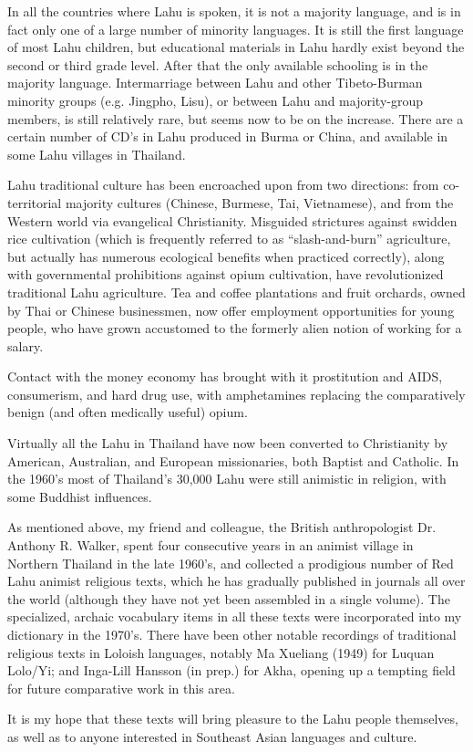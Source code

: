In all the countries where Lahu is spoken, it is not a majority
language, and is in fact only one of a large number of minority
languages. It is still the first language of most Lahu children, but
educational materials in Lahu hardly exist beyond the second or third
grade level. After that the only available schooling is in the majority
language. Intermarriage between Lahu and other Tibeto-Burman minority
groups (e.g. Jingpho, Lisu), or between Lahu and majority-group members,
is still relatively rare, but seems now to be on the increase. There are
a certain number of CD's in Lahu produced in Burma or China, and
available in some Lahu villages in Thailand.

Lahu traditional culture has been encroached upon from two directions:
from co-territorial majority cultures (Chinese, Burmese, Tai,
Vietnamese), and from the Western world via evangelical Christianity.
Misguided strictures against swidden rice cultivation (which is
frequently referred to as ``slash-and-burn'' agriculture, but actually
has numerous ecological benefits when practiced correctly), along with
governmental prohibitions against opium cultivation, have revolutionized
traditional Lahu agriculture. Tea and coffee plantations and fruit
orchards, owned by Thai or Chinese businessmen, now offer employment
opportunities for young people, who have grown accustomed to the
formerly alien notion of working for a salary.

Contact with the money economy has brought with it prostitution and
AIDS, consumerism, and hard drug use, with amphetamines replacing the
comparatively benign (and often medically useful) opium.

Virtually all the Lahu in Thailand have now been converted to
Christianity by American, Australian, and European missionaries, both
Baptist and Catholic. In the 1960's most of Thailand's 30,000 Lahu were
still animistic in religion, with some Buddhist influences.

As mentioned above, my friend and colleague, the British anthropologist
Dr. Anthony R. Walker, spent four consecutive years in an animist
village in Northern Thailand in the late 1960's, and collected a
prodigious number of Red Lahu animist religious texts, which he has
gradually published in journals all over the world (although they have
not yet been assembled in a single volume). The specialized, archaic
vocabulary items in all these texts were incorporated into my dictionary
in the 1970's. There have been other notable recordings of traditional
religious texts in Loloish languages, notably Ma Xueliang (1949) for
Luquan Lolo/Yi; and Inga-Lill Hansson (in prep.) for Akha, opening up
a tempting field for future comparative work in this area.

It is my hope that these texts will bring pleasure to the Lahu people
themselves, as well as to anyone interested in Southeast Asian
languages and culture.
